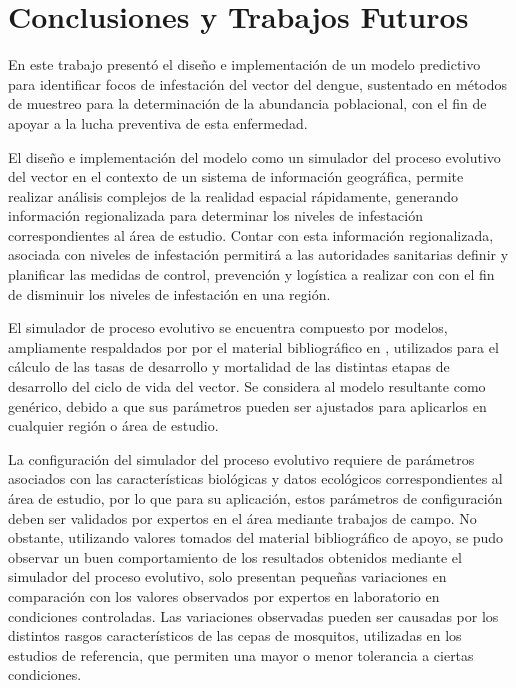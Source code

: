 \chapter{Conclusiones y Trabajos Futuros}
En este trabajo presentó el diseño e implementación de un modelo predictivo para identificar focos
de infestación del vector del dengue, sustentado en métodos de muestreo para la determinación de la
abundancia poblacional, con el fin de apoyar a la lucha preventiva de esta enfermedad.

El diseño e implementación del modelo como un simulador del proceso evolutivo del vector en el
contexto de un sistema de información geográfica, permite realizar análisis complejos de la
realidad espacial rápidamente, generando información regionalizada para determinar los niveles de
infestación correspondientes al área de estudio. Contar con esta información regionalizada,
asociada con niveles de infestación permitirá a las autoridades sanitarias definir y planificar
las medidas de control, prevención y logística a realizar con con el fin de disminuir los niveles
de infestación en una región.

El simulador de proceso evolutivo se encuentra compuesto por modelos, ampliamente respaldados por
por el material bibliográfico en
\cite{sharpe1977reaction, focks1993dynamic, schoolfield1981non, otero2006stochastic, rueda1990temperature}, utilizados para el cálculo de las tasas de desarrollo y mortalidad de las
distintas etapas de desarrollo del ciclo de vida del vector. Se considera al modelo resultante
como genérico, debido a que sus parámetros pueden ser ajustados para aplicarlos en cualquier
región o área de estudio.

La configuración del simulador del proceso evolutivo requiere de parámetros asociados con las
características biológicas y datos ecológicos correspondientes al área de estudio, por lo que para
su aplicación, estos parámetros de configuración deben ser validados por expertos en el área
mediante trabajos de campo. No obstante, utilizando valores tomados del material bibliográfico de
apoyo, se pudo observar un buen comportamiento de los resultados obtenidos mediante el simulador
del proceso evolutivo, solo presentan pequeñas variaciones en comparación con los valores
observados por expertos en laboratorio en condiciones controladas. Las variaciones observadas
pueden ser causadas por los distintos rasgos característicos de las cepas de mosquitos, utilizadas
en los estudios de referencia, que permiten una mayor o menor tolerancia a ciertas condiciones.

